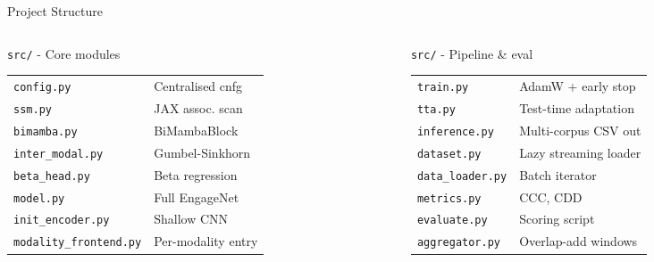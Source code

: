 \documentclass[aspectratio=169]{beamer}
\begin{document}
	\begin{frame}{Project Structure}
		\begin{columns}[onlytextwidth]
			\begin{column}{0.46\textwidth}
				\begin{block}{\texttt{src/} - Core modules}
					\footnotesize
					\begin{tabular}{ll}
						\texttt{config.py} & Centralised cnfg \\
						\texttt{ssm.py} & JAX assoc. scan \\
						\texttt{bimamba.py} & BiMambaBlock \\
						\texttt{inter\_modal.py} & Gumbel-Sinkhorn \\
						\texttt{beta\_head.py} & Beta regression \\
						\texttt{model.py} & Full EngageNet \\
						\texttt{init\_encoder.py} & Shallow CNN \\
						\texttt{modality\_frontend.py} & Per-modality entry \\
					\end{tabular}
				\end{block}
			\end{column}
			\begin{column}{0.50\textwidth}
				\begin{block}{\texttt{src/} - Pipeline \& eval}
					\footnotesize
					\begin{tabular}{ll}
						\texttt{train.py} & AdamW + early stop \\
						\texttt{tta.py} & Test-time adaptation \\
						\texttt{inference.py} & Multi-corpus CSV out \\
						\texttt{dataset.py} & Lazy streaming loader \\
						\texttt{data\_loader.py} & Batch iterator \\
						\texttt{metrics.py} & CCC, CDD \\
						\texttt{evaluate.py} & Scoring script \\
						\texttt{aggregator.py} & Overlap-add windows \\
					\end{tabular}
				\end{block}
			\end{column}
		\end{columns}
	\end{frame}
\end{document}
